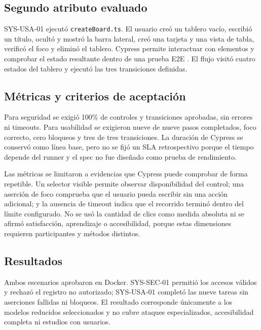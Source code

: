 \documentclass[conference]{IEEEtran}
\begin{document}
\subsection{Segundo atributo evaluado}
SYS-USA-01 ejecutó \texttt{createBoard.ts}. El usuario creó un tablero vacío, escribió un título, ocultó y mostró la barra lateral, creó una tarjeta y una vista de tabla, verificó el foco y eliminó el tablero. Cypress permite interactuar con elementos y comprobar el estado resultante dentro de una prueba E2E \cite{cypressDocs}. El flujo visitó cuatro estados del tablero y ejecutó las tres transiciones definidas.
\vspace{\baselineskip}

\subsection{Métricas y criterios de aceptación}
Para seguridad se exigió 100\% de controles y transiciones aprobadas, sin errores ni timeouts. Para usabilidad se exigieron nueve de nueve pasos completados, foco correcto, cero bloqueos y tres de tres transiciones. La duración de Cypress se conservó como línea base, pero no se fijó un SLA retrospectivo porque el tiempo depende del runner y el spec no fue diseñado como prueba de rendimiento.

Las métricas se limitaron a evidencias que Cypress puede comprobar de forma repetible. Un selector visible permite observar disponibilidad del control; una aserción de foco comprueba que el usuario pueda escribir sin una acción adicional; y la ausencia de timeout indica que el recorrido terminó dentro del límite configurado. No se usó la cantidad de clics como medida absoluta ni se afirmó satisfacción, aprendizaje o accesibilidad, porque estas dimensiones requieren participantes y métodos distintos.
\vspace{\baselineskip}

\subsection{Resultados}
Ambos escenarios aprobaron en Docker. SYS-SEC-01 permitió los accesos válidos y rechazó el registro no autorizado; SYS-USA-01 completó las nueve tareas sin aserciones fallidas ni bloqueos. El resultado corresponde únicamente a los modelos reducidos seleccionados y no cubre ataques especializados, accesibilidad completa ni estudios con usuarios.
\vspace{\baselineskip}
\end{document}
